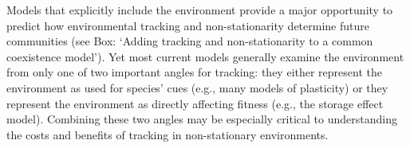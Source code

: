 \documentclass[11pt,letterpaper]{article}
\newcommand{\R}[1]{\label{#1}\linelabel{#1}}
\begin{document}
Models that explicitly include the environment provide a major opportunity to predict how environmental tracking and non-stationarity determine future communities (see Box: `Adding tracking and non-stationarity to a common coexistence model'). Yet most current models generally examine the environment from only one of two important angles for tracking: they either represent the environment as used for species' cues (e.g., many models of plasticity) or they represent the environment as directly affecting fitness (e.g., the storage effect model). Combining these two angles may be especially critical to understanding the costs and benefits of tracking in non-stationary environments. \R{modelcosts1} 



\end{document}
